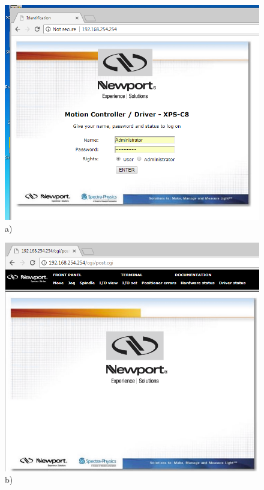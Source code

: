 \documentclass[14pt,a4paper] {article}
\begin{document}
\begin{figure}
\begin{minipage}{0.4\linewidth}
\includegraphics[width = 1\linewidth]{DL-3} \\a) 
\end{minipage}
\begin{minipage}{0.4\linewidth}
\includegraphics[width = 1\linewidth]{DL-4} \\b) 
\end{minipage}

\end{figure}
\end{document}
